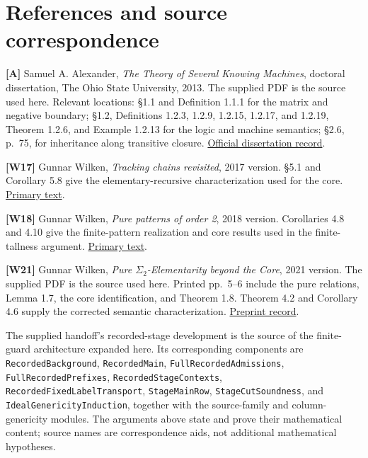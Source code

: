 \documentclass[
  11pt,
  letterpaper,
]{article}
\begin{document}
\section{References and source
correspondence}\label{references-and-source-correspondence}

\textbf{{[}A{]}} Samuel A. Alexander, \emph{The Theory of Several
Knowing Machines}, doctoral dissertation, The Ohio State University,
2013. The supplied PDF is the source used here. Relevant locations: §1.1
and Definition 1.1.1 for the matrix and negative boundary; §1.2,
Definitions 1.2.3, 1.2.9, 1.2.15, 1.2.17, and 1.2.19, Theorem 1.2.6, and
Example 1.2.13 for the logic and machine semantics; §2.6, p.~75, for
inheritance along transitive closure.
\href{https://etd.ohiolink.edu/acprod/odb_etd/etd/r/1501/10?clear=10&p10_accession_num=osu1366362999}{Official
dissertation record}.

\textbf{{[}W17{]}} Gunnar Wilken, \emph{Tracking chains revisited}, 2017
version. §5.1 and Corollary 5.8 give the elementary-recursive
characterization used for the core.
\href{https://arxiv.org/html/1611.04348v3}{Primary text}.

\textbf{{[}W18{]}} Gunnar Wilken, \emph{Pure patterns of order 2}, 2018
version. Corollaries 4.8 and 4.10 give the finite-pattern realization
and core results used in the finite-tallness argument.
\href{https://arxiv.org/html/1608.08421v5}{Primary text}.

\textbf{{[}W21{]}} Gunnar Wilken, \emph{Pure \(\Sigma_2\)-Elementarity
beyond the Core}, 2021 version. The supplied PDF is the source used
here. Printed pp.~5--6 include the pure relations, Lemma 1.7, the core
identification, and Theorem 1.8. Theorem 4.2 and Corollary 4.6 supply
the corrected semantic characterization.
\href{https://arxiv.org/abs/1710.01870}{Preprint record}.

The supplied handoff's recorded-stage development is the source of the
finite-guard architecture expanded here. Its corresponding components
are \texttt{Recorded\allowbreak{}Background},
\texttt{Recorded\allowbreak{}Main},
\texttt{Full\allowbreak{}Recorded\allowbreak{}Admissions},
\texttt{Full\allowbreak{}Recorded\allowbreak{}Prefixes},
\texttt{Recorded\allowbreak{}Stage\allowbreak{}Contexts},
\texttt{Recorded\allowbreak{}Fixed\allowbreak{}Label\allowbreak{}Transport},
\texttt{Stage\allowbreak{}Main\allowbreak{}Row},
\texttt{Stage\allowbreak{}Cut\allowbreak{}Soundness}, and
\texttt{Ideal\allowbreak{}Genericity\allowbreak{}Induction}, together
with the source-family and column-genericity modules. The arguments
above state and prove their mathematical content; source names are
correspondence aids, not additional mathematical hypotheses.
\end{document}
